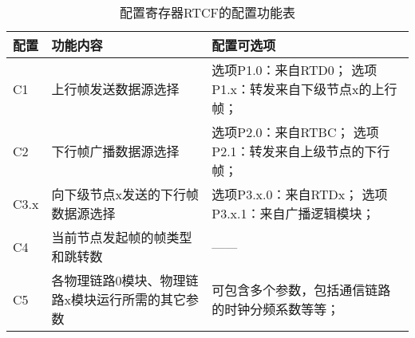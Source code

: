\begin{table}
    \centering
    \caption[配置寄存器RTCF的配置功能表]{配置寄存器RTCF的配置功能表\label{tb:rtmq_link_rtcf}}
    \begin{tabular}{C{1.5cm}|C{5.5cm}|C{6cm}}
        \toprule
        配置 & 功能内容 & 配置可选项\\
        \midrule
        C1 & 上行帧发送数据源选择 & 选项P1.0：来自RTD0；
        选项P1.x：转发来自下级节点x的上行帧；
        \\
        C2 & 下行帧广播数据源选择 & 选项P2.0：来自RTBC；
        选项P2.1：转发来自上级节点的下行帧；
        \\
        C3.x & 向下级节点x发送的下行帧数据源选择 & 选项P3.x.0：来自RTDx；
        选项P3.x.1：来自广播逻辑模块；
        \\
        C4 & 当前节点发起帧的帧类型和跳转数 & —— \\
        C5 & 各物理链路0模块、物理链路x模块运行所需的其它参数 & 可包含多个参数，包括通信链路的时钟分频系数等等；\\
        \bottomrule
    \end{tabular}
\end{table}





